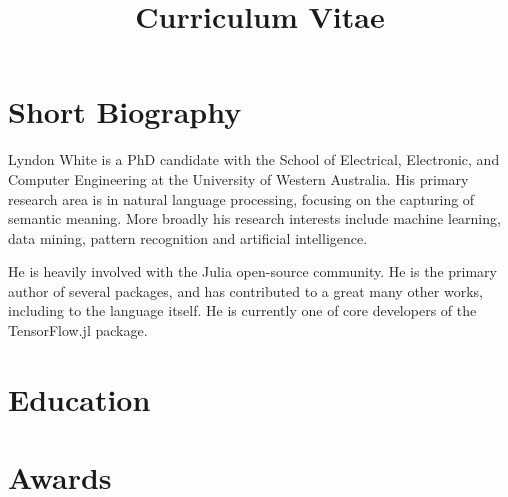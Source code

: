 \documentclass[11pt,a4paper,sans]{moderncv}
\title{Curriculum Vitae}
\begin{document}
\makecvtitle
\section{Short Biography}
Lyndon White is a PhD candidate with the School of Electrical, Electronic, and Computer Engineering at the University of Western Australia.
His primary research area is in natural language processing,
focusing on the capturing of semantic meaning.
More broadly his research interests include machine learning, data mining, pattern recognition and artificial intelligence.

He is heavily involved with the Julia open-source community.
He is the primary author of several packages,
and has contributed to a great many other works,
including to the language itself.
He is currently one of core developers of the TensorFlow.jl package.




\section{Education}

\section{Awards}

\nocite{*}

 
\end{document}
